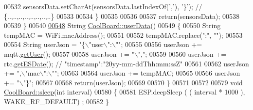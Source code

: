 \begin{DoxyCode}
00532         sensorsData.setCharAt(sensorsData.lastIndexOf(\textcolor{charliteral}{','}), \textcolor{charliteral}{'\}'}); \textcolor{comment}{// \{..,..,..,..,..,..,..,..\}}
00533         
00534     \}
00535 
00536 
00537     \textcolor{keywordflow}{return}(sensorsData);
00538 
00539 \}
00540 
\hyperlink{class_cool_board_ae7358fb6e623cfc81b775f5f1734909b}{00548} String \hyperlink{class_cool_board_ae7358fb6e623cfc81b775f5f1734909b}{CoolBoard::userData}()
00549 \{
00550     String tempMAC = WiFi.macAddress();
00551 
00552     tempMAC.replace(\textcolor{stringliteral}{":"}, \textcolor{stringliteral}{""});
00553 
00554     String userJson = \textcolor{stringliteral}{"\{\(\backslash\)"user\(\backslash\)":\(\backslash\)""};
00555 
00556     userJson += mqtt.\hyperlink{class_cool_m_q_t_t_a373cc92fca7760d886f02d8a6e5b3f63}{getUser}();
00557 
00558     userJson += \textcolor{stringliteral}{"\(\backslash\)","};
00559 
00560     userJson += rtc.\hyperlink{class_cool_time_ac4f32ee513c1328d984306645e8785a4}{getESDate}(); \textcolor{comment}{// "timestamp":"20yy-mm-ddThh:mm:ssZ"}
00561 
00562     userJson += \textcolor{stringliteral}{",\(\backslash\)"mac\(\backslash\)":\(\backslash\)""};
00563 
00564     userJson += tempMAC;
00565 
00566     userJson += \textcolor{stringliteral}{"\(\backslash\)"\}"};  
00567     
00568     \textcolor{keywordflow}{return}(userJson);
00569     
00570 \}
00571 
00572 
\hyperlink{class_cool_board_a5d0c8ff93b615efd676be432de9f164a}{00579} \textcolor{keywordtype}{void} \hyperlink{class_cool_board_a5d0c8ff93b615efd676be432de9f164a}{CoolBoard::sleep}(\textcolor{keywordtype}{int} interval)
00580 \{
00581     ESP.deepSleep ( ( interval * 1000 ), WAKE\_RF\_DEFAULT) ;
00582 \}
\end{DoxyCode}
